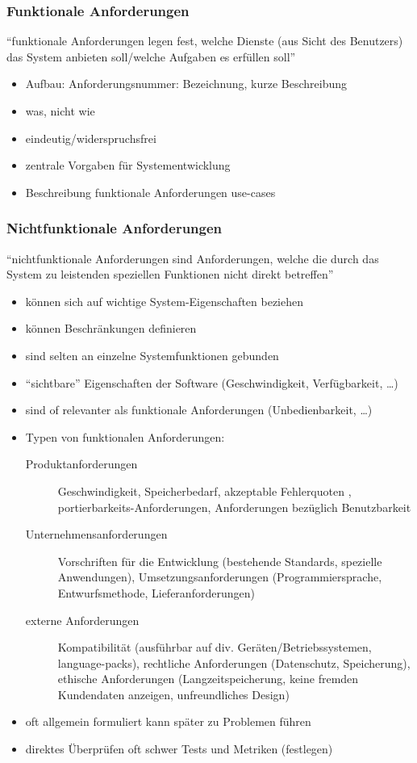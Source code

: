 \documentclass[a4paper, 10pt]{article}
\begin{document}
\subsubsection{Funktionale Anforderungen}
\begin{shaded}
``funktionale Anforderungen legen fest, welche Dienste (aus Sicht des Benutzers) das System anbieten soll/welche Aufgaben es erfüllen soll''
\end{shaded}
\begin{itemize}
	\item Aufbau: Anforderungsnummer: Bezeichnung, kurze Beschreibung
	\item was, nicht wie
	\item eindeutig/widerspruchsfrei
	\item zentrale Vorgaben für Systementwicklung
	\item Beschreibung funktionale Anforderungen \follows use-cases
\end{itemize}

\subsubsection{Nichtfunktionale Anforderungen}
\begin{shaded}
"`nichtfunktionale Anforderungen sind Anforderungen, welche die durch das System zu leistenden speziellen Funktionen nicht direkt betreffen"'
\end{shaded}
\begin{itemize}
	\item können sich auf wichtige System-Eigenschaften beziehen
	\item können Beschränkungen definieren
	\item sind selten an einzelne Systemfunktionen gebunden
	\item "`sichtbare"'  Eigenschaften der Software (Geschwindigkeit, Verfügbarkeit, \dots)
	\item sind of relevanter als funktionale Anforderungen (Unbedienbarkeit, \dots)
	\item Typen von funktionalen Anforderungen:
	\begin{description}
		\item[Produktanforderungen] Geschwindigkeit, Speicherbedarf, akzeptable Fehlerquoten , portierbarkeits-Anforderungen, Anforderungen bezüglich Benutzbarkeit
		\item[Unternehmensanforderungen] Vorschriften für die Entwicklung (bestehende Standards, spezielle Anwendungen), Umsetzungsanforderungen (Programmiersprache, Entwurfsmethode, Lieferanforderungen)
		\item[externe Anforderungen] Kompatibilität (ausführbar auf div. Geräten/Betriebssystemen, language-packs), rechtliche Anforderungen (Datenschutz, Speicherung), ethische Anforderungen (Langzeitspeicherung, keine fremden Kundendaten anzeigen, unfreundliches Design)
	\end{description}
	\item oft allgemein formuliert \follows kann später zu Problemen führen
	\item direktes Überprüfen oft schwer \follows Tests und Metriken (festlegen)
\end{itemize}
\end{document}
